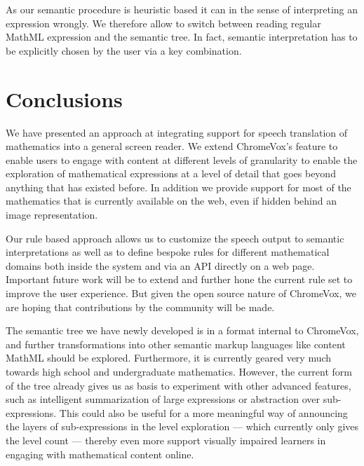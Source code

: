 \documentclass{sig-alternate}
\begin{document}
As our semantic procedure is heuristic based it can in the sense of interpreting
an expression wrongly. We therefore allow to switch between reading regular
MathML expression and the semantic tree. In fact, semantic interpretation has to
be explicitly chosen by the user via a key combination.

\section{Conclusions}
\label{sec:conc}

We have presented an approach at integrating support for speech translation of
mathematics into a general screen reader. We extend ChromeVox's feature to
enable users to engage with content at different levels of granularity to enable
the exploration of mathematical expressions at a level of detail that goes
beyond anything that has existed before. In addition we provide support for most
of the mathematics that is currently available on the web, even if hidden behind
an image representation.

Our rule based approach allows us to customize the speech output to semantic
interpretations as well as to define bespoke rules for different mathematical
domains both inside the system and via an API directly on a web page.  Important
future work will be to extend and further hone the current rule set to improve
the user experience.  But given the open source nature of ChromeVox, we are
hoping that contributions by the community will be made.

The semantic tree we have newly developed is in a format internal to ChromeVox,
and further transformations into other semantic markup languages like content
MathML should be explored. Furthermore, it is currently geared very much towards
high school and undergraduate mathematics.  However, the current form of the
tree already gives us as basis to experiment with other advanced features, such
as intelligent summarization of large expressions or abstraction over
sub-expressions. This could also be useful for a more meaningful way of
announcing the layers of sub-expressions in the level exploration --- which
currently only gives the level count --- thereby even more support visually
impaired learners in engaging with mathematical content online.
\end{document}
